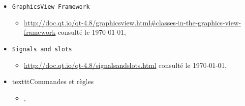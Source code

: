 \documentclass[a4paper,11pt]{report}
\begin{document}
\begin{itemize}
		\begin{itemize}
			\item \url{http://doc.qt.io/qt-4.8/graphicsview.html} consulté le
				\today, \\
		\end{itemize}
	\item[] \texttt{GraphicsView Framework}
		\begin{itemize}
			\item
				\url{http://doc.qt.io/qt-4.8/graphicsview.html#classes-in-the-graphics-view-framework}
				consulté le \today, \\
		\end{itemize}
	\item[] \texttt{Signals and slots}
		\begin{itemize}
			\item \url{http://doc.qt.io/qt-4.8/signalsandslots.html} consulté le
				\today, \\
		\end{itemize}
	\item[] texttt{Commandes et règles}
		\begin{itemize}
			\item {},\\
		\end{itemize}
\end{itemize}
\end{document}

